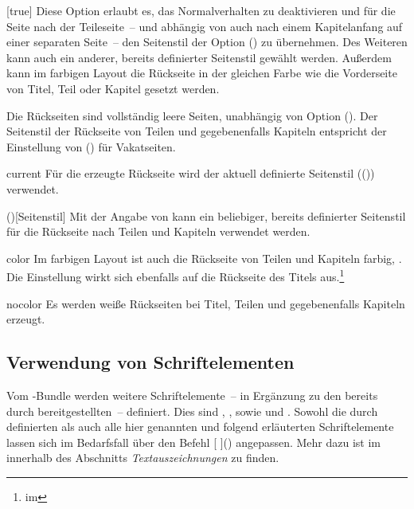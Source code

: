 \begin{Declaration*}{}
\begin{Declaration*}{}
\begin{Declaration*}{}
\begin{Declaration}{}[true]
Diese Option erlaubt es, das Normalverhalten zu deaktivieren und für die Seite 
nach der Teileseite~-- und abhängig von  auch nach einem 
Kapitelanfang auf einer separaten Seite~-- den Seitenstil der Option 
() zu übernehmen. Des Weiteren 
kann auch ein anderer, bereits definierter Seitenstil gewählt werden. Außerdem 
kann im farbigen Layout die Rückseite in der gleichen Farbe wie die Vorderseite 
von Titel, Teil oder Kapitel gesetzt werden. 
\notudscrartcl
%
\begin{values}{}
\itemfalse
  Die Rückseiten sind vollständig leere Seiten, unabhängig von Option
  ().
\itemtrue*
  Der Seitenstil der Rückseite von Teilen und gegebenenfalls Kapiteln entspricht
  der Einstellung von () für 
  Vakatseiten.
\item[current]
  Für die erzeugte Rückseite wird der aktuell definierte Seitenstil 
  (()) verwendet.
\item(\PName)[Seitenstil]
  Mit der Angabe von  
  kann ein beliebiger, bereits definierter Seitenstil für die Rückseite nach 
  Teilen und Kapiteln verwendet werden.
\item[color]
  Im farbigen Layout ist auch die Rückseite von Teilen und Kapiteln farbig,  
  . Die Einstellung wirkt sich ebenfalls auf die Rückseite 
  des Titels aus.\footnote{%
     im \scrguide*%
  }%
\item[nocolor]
  Es werden weiße Rückseiten bei Titel, Teilen und gegebenenfalls Kapiteln 
  erzeugt.
\end{values}
%
\end{Declaration}



\subsection{Verwendung von Schriftelementen}
%
%
%
Vom \TUDScript-Bundle werden weitere Schriftelemente~-- in Ergänzung zu den 
bereits durch \KOMAScript{} bereitgestellten~-- definiert. Dies sind 
, ,  sowie 
und . Sowohl die durch \KOMAScript{} definierten als auch 
alle hier genannten und folgend erläuterten Schriftelemente lassen sich im 
Bedarfsfall über den Befehl [%
]() angepassen. Mehr dazu ist im \scrguide innerhalb des 
Abschnitts \emph{Textauszeichnungen} zu finden.




\end{Declaration*}
\end{Declaration*}
\end{Declaration*}
